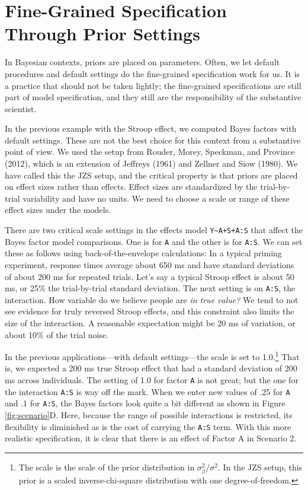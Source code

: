 \documentclass[
  english,
  ,man]{apa6}
\begin{document}
\hypertarget{fine-grained-specification-through-prior-settings}{%
\section{Fine-Grained Specification Through Prior Settings}\label{fine-grained-specification-through-prior-settings}}

In Bayesian contexts, priors are placed on parameters. Often, we let default procedures and default settings do the fine-grained specification work for us. It is a practice that should not be taken lightly; the fine-grained specifications are still part of model specification, and they still are the responsibility of the substantive scientist.

In the previous example with the Stroop effect, we computed Bayes factors with default settings. These are not the best choice for this context from a substantive point of view. We used the setup from Rouder, Morey, Speckman, and Province (2012), which is an extension of Jeffreys (1961) and Zellner and Siow (1980). We have called this the JZS setup, and the critical property is that priors are placed on effect sizes rather than effects. Effect sizes are standardized by the trial-by-trial variability and have no units. We need to choose a scale or range of these effect sizes under the models.

There are two critical scale settings in the effects model \texttt{Y\textasciitilde{}A+S+A:S} that affect the Bayes factor model comparisons. One is for \texttt{A} and the other is for \texttt{A:S}. We can set these as follows using back-of-the-envelope calculations: In a typical priming experiment, response times average about 650 ms and have standard deviations of about 200 ms for repeated trials. Let's say a typical Stroop effect is about 50 ms, or 25\% the trial-by-trial standard deviation. The next setting is on \texttt{A:S}, the interaction. How variable do we believe people are \emph{in true value?} We tend to not see evidence for truly reversed Stroop effects, and this constraint also limits the size of the interaction. A reasonable expectation might be 20 ms of variation, or about 10\% of the trial noise.

In the previous applications---with default settings---the scale is set to 1.0.\footnote{The scale is the scale of the prior distribution in \(\sigma^2_\beta/\sigma^2\). In the JZS setup, this prior is a scaled inverse-chi-square distribution with one degree-of-freedom.} That is, we expected a 200 ms true Stroop effect that had a standard deviation of 200 ms across individuals. The setting of 1.0 for factor \texttt{A} is not great; but the one for the interaction \texttt{A:S} is way off the mark. When we enter new values of .25 for \texttt{A} and .1 for \texttt{A:S}, the Bayes factors look quite a bit different as shown in Figure \ref{fig:scenario}D. Here, because the range of possible interactions is restricted, its flexibility is diminished as is the cost of carrying the \texttt{A:S} term. With this more realistic specification, it is clear that there is an effect of Factor A in Scenario 2.
\end{document}

